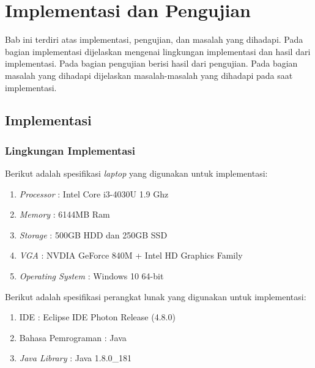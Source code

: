 \chapter{Implementasi dan Pengujian}
\label{chap:implementasi_dan_pengujian}

Bab ini terdiri atas implementasi, pengujian, dan masalah yang dihadapi. Pada bagian implementasi dijelaskan mengenai lingkungan implementasi dan hasil dari implementasi. Pada bagian pengujian berisi hasil dari pengujian. Pada bagian masalah yang dihadapi dijelaskan masalah-masalah yang dihadapi pada saat implementasi.

\section{Implementasi}
\label{sec:implementasi}

\subsection{Lingkungan Implementasi}
\label{ssec:lingkungan_implementasi_dan_pengujian}

Berikut adalah spesifikasi \textit{laptop} yang digunakan untuk implementasi:
\begin{enumerate}
    \item \textit{Processor} : Intel Core i3-4030U 1.9 Ghz
    \item \textit{Memory} : 6144MB Ram
    \item \textit{Storage} : 500GB HDD dan 250GB SSD
    \item \textit{VGA} : NVDIA GeForce 840M + Intel HD Graphics Family
    \item \textit{Operating System} : Windows 10 64-bit\\
\end{enumerate}

Berikut adalah spesifikasi perangkat lunak yang digunakan untuk implementasi:
\begin{enumerate}
    \item IDE : Eclipse IDE Photon Release (4.8.0)
    \item Bahasa Pemrograman : Java
    \item \textit{Java Library} : Java 1.8.0\_181\\
\end{enumerate}

